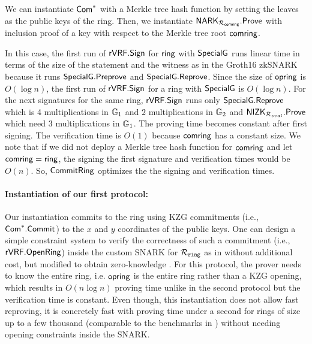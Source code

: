 We can instantiate $ \mathsf{Com}^*$ with a Merkle tree hash function by setting the leaves as the public keys of the ring. Then, we instantiate $ \mathsf{NARK}_{\mathcal{R}_{\mathsf{comring}}}.{\mathsf{Prove}} $ with inclusion proof of a key with respect to the Merkle tree root $ \mathsf{comring} $.

In this case, the first run of ${\mathsf{rVRF}}.{\mathsf{Sign}}$ for $\mathsf{ring}$ with $ {\mathsf{SpecialG}} $ runs linear time in terms of the size of the statement and the witness as in the Groth16 zkSNARK \cite{Groth16} because it runs $ {\mathsf{SpecialG}}.{\mathsf{Preprove}} $ and $ {\mathsf{SpecialG}}.{\mathsf{Reprove}} $. Since the size of $ \mathsf{opring} $ is
$ O(\log n) $, the first run of ${\mathsf{rVRF}}.{\mathsf{Sign}}$ for a ring with $ {\mathsf{SpecialG}} $ is $ O(\log n) $.
For the next signatures for the same ring,  ${\mathsf{rVRF}}.{\mathsf{Sign}}$  runs only  ${\mathsf{SpecialG}}.{\mathsf{Reprove}}$ which is 4 multiplications in $\mathbb{G}_1 $ and $2$ multiplications in $\mathbb{G}_2$ and  ${\mathsf{NIZK}}_{\mathcal{R}_{eval}}.{\mathsf{Prove}}$ which need  3 multiplications in $ \mathbb{G}_1 $.  The proving time becomes constant after first signing. 
The verification time is $ O(1) $ because $ \mathsf{comring} $ has a constant size.
We note that if we did not deploy a Merkle tree hash function for $ \mathsf{comring} $ and let $ \mathsf{comring} = \mathsf{ring} $, the signing the first signature and verification times would be $ O(n) $. So, $ {\mathsf{CommitRing}} $ optimizes the the signing and verification times.

\paragraph{Instantiation of our first protocol:}  Our instantiation commits to the ring using KZG commitments (i.e., $ \mathsf{Com}^*.\mathsf{Commit} $) to the $ x $ and $ y $ coordinates of the public keys.
One can design a simple constraint system to verify the correctness of such a commitment (i.e., $ {\mathsf{rVRF}}.{\mathsf{OpenRing}} $) inside the custom SNARK for $\mathcal{R}_{\mathtt{ring}}$ as in \cite{accountable} without additional cost, but  modified to obtain zero-knowledge \cite{plonk}.  For this protocol, the prover needs to know the entire ring, i.e. $\mathsf{opring}$ is the entire ring rather than a KZG opening, which results in $O(n \log n)$ proving time unlike in the second protocol but the verification time is constant. Even though, this instantiation  does not allow fast reproving,  it is concretely fast with proving time under a second for rings of size up to a few thousand (comparable to the benchmarks in \cite{accountable}) without needing opening constraints inside the SNARK. 

